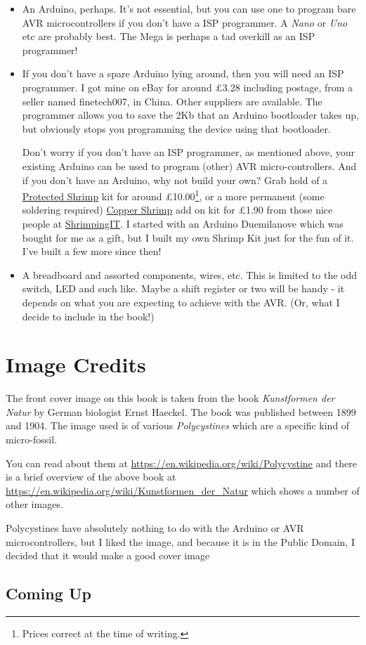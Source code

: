 \begin{itemize}
\item
  An Arduino, perhaps. It's not essential, but you can use one to
  program bare AVR microcontrollers if you don't have a ISP programmer.
  A \emph{Nano} or \emph{Uno} etc are probably best. The Mega is perhaps
  a tad overkill as an ISP programmer!
\item
  If you don't have a spare Arduino lying around, then you will need an
  ISP programmer. I got mine on eBay for around £3.28 including postage,
  from a seller named finetech007, in China. Other suppliers are
  available. The programmer allows you to save the 2Kb that an Arduino
  bootloader takes up, but obviously stops you programming the device
  using that bootloader.

  Don't worry if you don't have an ISP programmer, as mentioned above,
  your existing Arduino can be used to program (other) AVR
  micro-controllers. And if you don't have an Arduino, why not build
  your own? Grab hold of a
  \href{http://start.shrimping.it/project/protected/build.html}{Protected
  Shrimp} kit for around £10.00\footnote{Prices correct at the time of
    writing.}, or a more permanent (some soldering required)
  \href{http://start.shrimping.it/kit/stripboard.html}{Copper Shrimp}
  add on kit for £1.90 from those nice people at
  \href{http://start.shrimping.it//index.html}{ShrimpingIT}. I started
  with an Arduino Duemilanove which was bought for me as a gift, but I
  built my own Shrimp Kit just for the fun of it. I've built a few more
  since then!
\item
  A breadboard and assorted components, wires, etc. This is limited to
  the odd switch, LED and such like. Maybe a shift register or two will
  be handy - it depends on what you are expecting to achieve with the
  AVR. (Or, what I decide to include in the book!)
\end{itemize}

\section*{Image Credits}\label{image-credits}

The front cover image on this book is taken from the book \emph{Kunstformen der Natur}
by German biologist Ernst Haeckel. The book was published between 1899 and 1904. The
image used is of various \emph{Polycystines} which are a specific kind of micro-fossil.

You can read about them at \url{https://en.wikipedia.org/wiki/Polycystine} and there is a
brief overview of the above book at \url{https://en.wikipedia.org/wiki/Kunstformen_der_Natur}
which shows a number of other images.

Polycystines have absolutely nothing to do with the Arduino or AVR microcontrollers,
but I liked the image, and because it is in the Public Domain, I decided that it would
make a good cover image

\subsection*{Coming Up}\label{coming-up}
